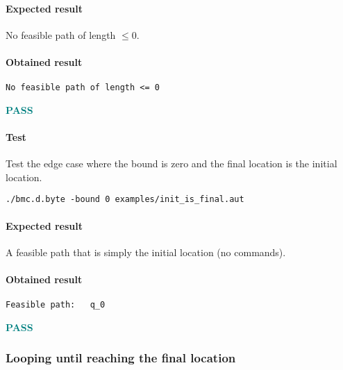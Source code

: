 \documentclass[letterpaper,12pt]{article}
\begin{document}
\paragraph{Expected result}
No feasible path of length $\leq 0$.
\paragraph{Obtained result}
\begin{verbatim}
No feasible path of length <= 0
\end{verbatim}
\textbf{\textcolor{teal}{PASS}}


\paragraph{Test}
Test the edge case where the bound is zero and the final location is the initial location.
\begin{verbatim}
./bmc.d.byte -bound 0 examples/init_is_final.aut 
\end{verbatim}
\paragraph{Expected result}
A feasible path that is simply the initial location (no commands).
\paragraph{Obtained result}
\begin{verbatim}
Feasible path:   q_0
\end{verbatim}
\textbf{\textcolor{teal}{PASS}}




\subsubsection{Looping until reaching the final location}\label{loop-to-final}
\end{document}
